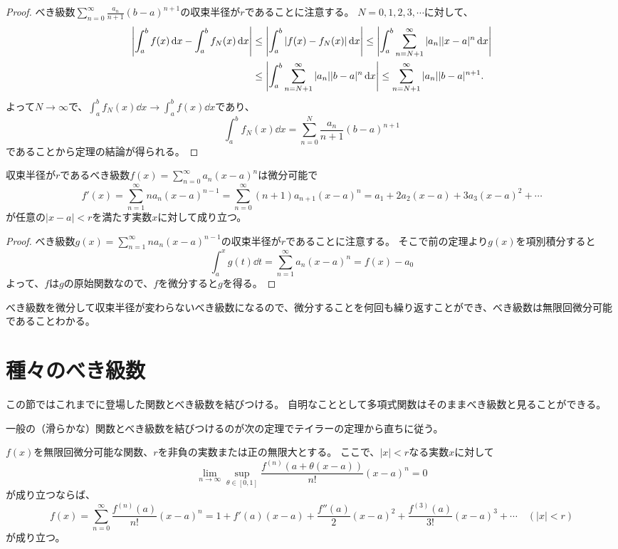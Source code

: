 \begin{proof}
べき級数$\sum_{n = 0}^\infty \frac{a_n}{n+1}(b-a)^{n+1}$の収束半径が$r$であることに注意する。
$N = 0, 1, 2, 3, \cdots$に対して、
$$
\begin{aligned}
\abs{\int_a^b f(x)\dd{x}-\int_a^b f_N(x)\dd{x}}
&\le \abs{\int_a^b |f(x)-f_N(x)|\dd{x}}
\le \abs{\int_a^b \sum_{n = N+1}^\infty |a_n||x-a|^n\dd{x}} \\
&\le \abs{\int_a^b \sum_{n = N+1}^\infty |a_n||b-a|^n\dd{x}}
\le \sum_{n = N+1}^\infty |a_n||b-a|^{n+1}.
\end{aligned}
$$
よって$N \to \infty$で、$\int_a^b f_N(x)\dd{x} \to \int_a^b f(x)\dd{x}$であり、
$$
\int_a^b f_N(x)\dd{x} = \sum_{n = 0}^N \frac{a_n}{n+1}(b-a)^{n+1}
$$
であることから定理の結論が得られる。
\end{proof}

\begin{theorem}[べき級数の項別積分]
収束半径が$r$であるべき級数$f(x) = \sum_{n = 0}^\infty a_n(x-a)^n$は微分可能で
$$
f'(x) = \sum_{n = 1}^\infty n a_n(x-a)^{n-1} = \sum_{n = 0}^\infty (n+1) a_{n+1}(x-a)^n = a_1+2 a_2(x-a)+3 a_3(x-a)^2+\cdots
$$
が任意の$|x-a| < r$を満たす実数$x$に対して成り立つ。
\end{theorem}

\begin{proof}
べき級数$g(x) = \sum_{n = 1}^\infty n a_n(x-a)^{n-1}$の収束半径が$r$であることに注意する。
そこで前の定理より$g(x)$を項別積分すると
$$
\int_a^x g(t)\dd{t} = \sum_{n = 1}^\infty a_n(x-a)^n = f(x)-a_0
$$
よって、$f$は$g$の原始関数なので、$f$を微分すると$g$を得る。
\end{proof}

\begin{remark}
べき級数を微分して収束半径が変わらないべき級数になるので、微分することを何回も繰り返すことができ、べき級数は無限回微分可能であることわかる。
\end{remark}

\section{種々のべき級数}

この節ではこれまでに登場した関数とべき級数を結びつける。
自明なこととして多項式関数はそのままべき級数と見ることができる。

一般の（滑らかな）関数とべき級数を結びつけるのが次の定理でテイラーの定理から直ちに従う。

\begin{theorem}
$f(x)$を無限回微分可能な関数、$r$を非負の実数または正の無限大とする。
ここで、$|x| < r$なる実数$x$に対して
$$
\lim_{n \to \infty}\sup_{\theta \in [0, 1]}\frac{f^{(n)}(a+\theta(x-a))}{n!}(x-a)^n = 0
$$
が成り立つならば、
\begin{equation}
\label{e_taylor_exp}
f(x) = \sum_{n = 0}^\infty \frac{f^{(n)}(a)}{n!}(x-a)^n = 1+f'(a)(x-a)+\frac{f''(a)}{2}(x-a)^2+\frac{f^{(3)}(a)}{3!}(x-a)^3+\cdots \quad (|x| < r)
\end{equation}
が成り立つ。
\end{theorem}

